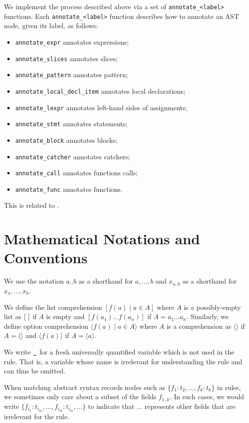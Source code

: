 \documentclass{book}
\begin{document}
We implement the process described above via a set of
\texttt{annotate\_<label>} functions. Each \texttt{annotate\_<label>}
function describes how to annotate an AST node, given its label, as follows:\begin{itemize}
\item \texttt{annotate\_expr} annotates expressions;
\item \texttt{annotate\_slices} annotates slices;
\item \texttt{annotate\_pattern} annotates pattern;
\item \texttt{annotate\_local\_decl\_item} annotates local declarations;
\item \texttt{annotate\_lexpr} annotates left-hand sides of assignments;
\item \texttt{annotate\_stmt} annotates statements;
\item \texttt{annotate\_block} annotates blocks;
\item \texttt{annotate\_catcher} annotates catchers;
\item \texttt{annotate\_call} annotates functions calls;
\item \texttt{annotate\_func} annotates functions.
\end{itemize}

This is related to .

\section{Mathematical Notations and Conventions}

We use the notation $a..b$ as a shorthand for $a,\ldots,b$ and $x_{a..b}$ as a shorthand for $x_a,\ldots,x_b$.

We define the list comprehension $[f(a) \;|\; a \in A]$ where $A$ is a possibly-empty list as $[\ ]$ if $A$ is empty and $[f(a_1) \ldots f(a_n)]$ if $A=a_1 \ldots a_n$.
Similarly, we define option comprehension $\langle f(a) \;|\; a \in A\rangle$ where $A$ is a comprehension as $\langle\rangle$ if $A=\langle\rangle$
and $\langle f(a)\rangle$ if $A=\langle a \rangle$.

We write $\texttt{\_}$ for a fresh universally quantified variable which is not used in the rule. That is, a variable whose name is irrelevant for understanding the rule and can thus be omitted.

When matching abstract syntax records nodes such as $\{f_1:t_2,\ldots,f_k:t_k\}$ in rules, we sometimes only care about a subset of the fields $f_{1..k}$.
In such cases, we would write $\{f_{i_1}:t_{i_m},\ldots,f_{i_m}:t_{i_m},\ldots\}$ to indicate that $\ldots$ represents other fields that are irrelevant for the rule.
\end{document}
